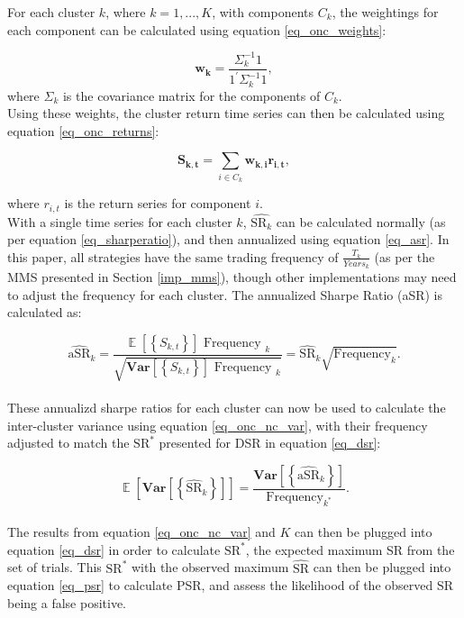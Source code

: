 \documentclass[a4paper,11pt,oneside]{article}
\newcommand{\Var}{\mathbf{Var}}
\DeclareMathOperator*{\E}{\mathbb{E}}
\theoremstyle{plain}
\theoremstyle{definition}
\begin{document}
	For each cluster $k$, where $k = 1, ..., K$, with components $C_k$, the weightings for each component can be calculated using equation \eqref{eq_onc_weights}:
	
	\begin{equation}\label{eq_onc_weights}
	\mathbf{w_{k}}=\frac{\Sigma_{k}^{-1} 1}{1^{\prime} \Sigma_{k}^{-1} 1}, 
	\end{equation}
		where $\Sigma_k$ is the covariance matrix for the components of $C_k$.\newline
	~\\
	Using these weights, the cluster return time series can then be calculated using equation \eqref{eq_onc_returns}:
	
	\begin{equation}\label{eq_onc_returns}
	\mathbf{S_{k, t}}=\sum_{i \in C_{k}} \mathbf{w_{k, i}} \mathbf{r_{i, t}}, 
	\end{equation}

	where $r_{i,t}$ is the return series for component $i$.\newline
	~\\
	With a single time series for each cluster $k$, $\widehat{\mathrm{SR}_k}$ can be calculated normally (as per equation \eqref{eq_sharperatio}), and then annualized using equation \eqref{eq_asr}. In this paper, all strategies have the same trading frequency of $\frac{T_k}{Years_k}$ (as per the MMS presented in Section \ref{imp_mms}), though other implementations may need to adjust the frequency for each cluster. The annualized Sharpe Ratio (aSR) is calculated as:
		
	\begin{equation}\label{eq_asr}
	\widehat{\mathrm{aSR}}_{k}=\frac{\mathrm{\E}\left[\left\{S_{k, t}\right\}\right] \text { Frequency }_{k}}{\sqrt{\mathrm{\Var}\left[\left\{S_{k, t}\right\}\right] \text { Frequency }_{k}}}=\widehat{\mathrm{SR}}_{k} \sqrt{\text {Frequency}_{k}} .
	\end{equation}
	~\\
	These annualizd sharpe ratios for each cluster can now be used to calculate the inter-cluster variance using equation \eqref{eq_onc_nc_var}, with their frequency adjusted to match the $\mathrm{SR}^*$ presented for DSR in equation \eqref{eq_dsr}:
		
	\begin{equation}\label{eq_onc_nc_var}
	\mathrm{\E}\left[\mathrm{\Var}\left[\left\{\widehat{\mathrm{SR}}_{k}\right\}\right]\right]=\frac{\mathrm{\Var}\left[\left\{\widehat{\mathrm{aSR}}_{k}\right\}\right]}{\text {Frequency}_{k^{*}}} .
	\end{equation}
	~\\
	The results from equation \eqref{eq_onc_nc_var} and $K$ can then be plugged into equation \eqref{eq_dsr} in order to calculate $\mathrm{SR}^*$, the expected maximum SR from the set of trials. This $\mathrm{SR}^*$ with the observed maximum $\widehat{\mathrm{SR}}$ can then be plugged into equation \eqref{eq_psr} to calculate PSR, and assess the likelihood of the observed $\widehat{\mathrm{SR}}$ being a false positive.
		
\end{document}
